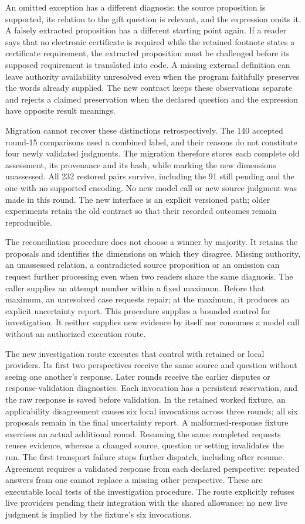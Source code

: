 An omitted exception has a different diagnosis: the source proposition is
supported, its relation to the gift question is relevant, and the expression
omits it. A falsely extracted proposition has a different starting point again.
If a reader says that no electronic certificate is required while the retained
footnote states a certificate requirement, the extracted proposition must be
challenged before its supposed requirement is translated into code. A missing
external definition can leave authority availability unresolved even when the
program faithfully preserves the words already supplied. The new contract
keeps these observations separate and rejects a claimed preservation when the
declared question and the expression have opposite result meanings.

Migration cannot recover these distinctions retrospectively. The 140 accepted
round-15 comparisons used a combined label, and their reasons do not constitute
four newly validated judgments. The migration therefore stores each complete
old assessment, its provenance and its hash, while marking the new dimensions
unassessed. All 232 restored pairs survive, including the 91 still pending and
the one with no supported encoding. No new model call or new source judgment
was made in this round. The new interface is an explicit versioned path; older
experiments retain the old contract so that their recorded outcomes remain
reproducible.

The reconciliation procedure does not choose a winner by majority. It retains
the proposals and identifies the dimensions on which they disagree. Missing
authority, an unassessed relation, a contradicted source proposition or an
omission can request further processing even when two readers share the same
diagnosis. The caller supplies an attempt number within a fixed maximum. Before
that maximum, an unresolved case requests repair; at the maximum, it produces
an explicit uncertainty report. This procedure supplies a bounded control for
investigation. It neither supplies new evidence by itself nor consumes a model
call without an authorized execution route.

The new investigation route executes that control with retained or local
providers. Its first two perspectives receive the same source and question
without seeing one another's response. Later rounds receive the earlier
disputes or response-validation diagnostics. Each invocation has a persistent
reservation, and the raw response is saved before validation. In the retained
worked fixture, an applicability disagreement causes six local invocations
across three rounds; all six proposals remain in the final uncertainty report.
A malformed-response fixture exercises an actual additional round. Resuming
the same completed requests reuses evidence, whereas a changed source, question
or setting invalidates the run. The first transport failure stops further
dispatch, including after resume. Agreement requires a validated response from
each declared perspective: repeated answers from one cannot replace a missing
other perspective. These are executable local tests of the
investigation procedure. The route explicitly refuses live providers pending
their integration with the shared allowance; no new live judgment is implied
by the fixture's six invocations.

